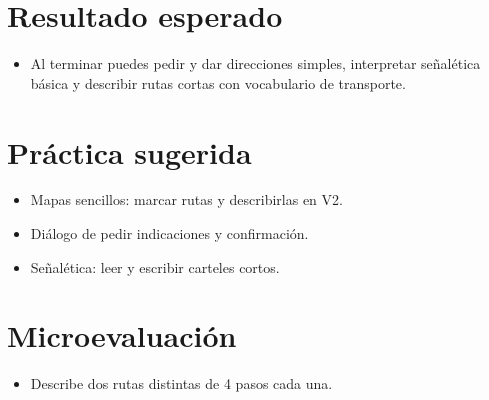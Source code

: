 \section{Resultado esperado}
\begin{itemize}[leftmargin=*]
	\item Al terminar puedes pedir y dar direcciones simples, interpretar señalética básica y describir rutas cortas con vocabulario de transporte.
\end{itemize}

\section{Práctica sugerida}
\begin{itemize}[leftmargin=*]
	\item Mapas sencillos: marcar rutas y describirlas en V2.
	\item Diálogo de pedir indicaciones y confirmación.
	\item Señalética: leer y escribir carteles cortos.
\end{itemize}

\section{Microevaluación}
\begin{itemize}[leftmargin=*]
	\item Describe dos rutas distintas de 4 pasos cada una.
\end{itemize}
